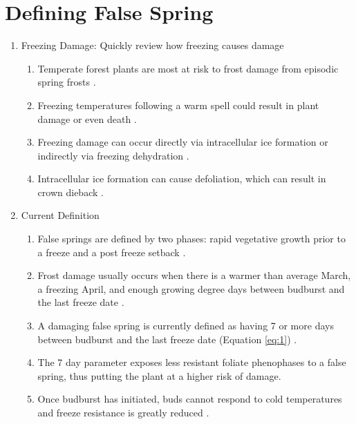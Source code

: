 \documentclass{article}\usepackage[]{graphicx}\usepackage[]{color}
\begin{document}


\section*{Defining False Spring}
\begin{enumerate}
\item Freezing Damage: Quickly review how freezing causes damage 
\begin{enumerate}
\item Temperate forest plants are most at risk to frost damage from episodic spring frosts \citep{Sakai1987}. 
\item Freezing temperatures following a warm spell could result in plant damage or even death \citep{Ludlum1968, Mock2007}.
\item Freezing damage can occur directly via intracellular ice formation or indirectly via freezing dehydration \citep{Pearce2001, Beck2004, Hofmann2015}.
\item Intracellular ice formation can cause defoliation, which can result in crown dieback \citep{Gu2008}. %
\end {enumerate}

\item Current Definition
\begin{enumerate}
\item False springs are defined by two phases: rapid vegetative growth prior to a freeze and a post freeze setback \citep{Gu2008}.
\item Frost damage usually occurs when there is a warmer than average March, a freezing April, and enough growing degree days between budburst and the last freeze date \citep{Augspurger2013}.
\item A damaging false spring is currently defined as having 7 or more days between budburst and the last freeze date (Equation \ref{eq:1}) \citep{Peterson2014}.
\item The 7 day parameter exposes less resistant foliate phenophases to a false spring, thus putting the plant at a higher risk of damage. 
\item Once budburst has initiated, buds cannot respond to cold temperatures and freeze resistance is greatly reduced \citep{Taschler2004, Lenz2013, Vitasse2014}.
\end{enumerate}
\end{enumerate}
\end{document}
